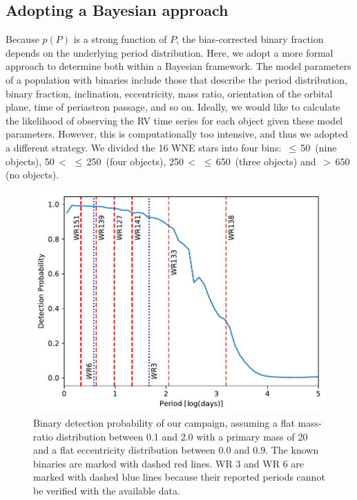\subsection{Adopting a Bayesian approach}\label{sect:bayesian}
Because $p(P)$ is a strong function of $P$, the bias-corrected binary fraction depends on the underlying period distribution. Here, we adopt a more formal approach to determine both within a Bayesian framework. The model parameters of a population with binaries include those that describe the period distribution, binary fraction, inclination, eccentricity, mass ratio, orientation of the orbital   plane, time of periastron passage, and so on. Ideally, we would like to calculate the likelihood of observing the RV time series for each object given these model parameters. However, this is computationally too intensive, and thus we adopted a different strategy. We divided the 16 WNE stars into four \DelRV{} bins: \DelRV{}\,$\le$\,50\,\kms{} (nine objects), 50\,$<$\,\DelRV{}\,$\le$\,250\,\kms{} (four objects), 250\,$<$\,\DelRV{}\,$\le$\,650\,\kms{} (three objects) and  \DelRV{}\,$>$\,650\,\kms{} (no objects).

\begin{figure}[t]
    \centering
    \includegraphics[width=\textwidth]{chapters/WNE/image/Pdetect_PM2_thres50_JUL15.pdf}
    \caption{Binary detection probability of our campaign, assuming a flat mass-ratio distribution between 0.1 and 2.0 with a primary mass of 20\,\Msun{} and a flat eccentricity distribution between 0.0 and 0.9. The known binaries are marked with dashed red lines. WR 3 and WR 6 are marked with dashed blue lines because their reported periods cannot be verified with the available data.}
    \label{fig:Pdetect_overall}
\end{figure}

